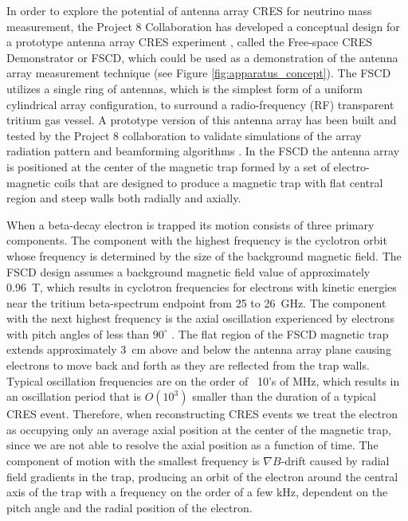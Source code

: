 In order to explore the potential of antenna array CRES for neutrino mass measurement, the Project 8 Collaboration has developed a conceptual design for a prototype antenna array CRES experiment \cite{p8PanicProc,p8snowmass2022}, called the Free-space CRES Demonstrator or FSCD, which could be used as a demonstration of the antenna array measurement technique (see Figure \ref{fig:apparatus_concept}). The FSCD utilizes a single ring of antennas, which is the simplest form of a uniform cylindrical array configuration, to surround a radio-frequency (RF) transparent tritium gas vessel. A prototype version of this antenna array has been built and tested by the Project 8 collaboration to validate simulations of the array radiation pattern and beamforming algorithms \cite{p8jugaad}. In the FSCD the antenna array is positioned at the center of the magnetic trap formed by a set of electro-magnetic coils that are designed to produce a magnetic trap with flat central region and steep walls both radially and axially. 

When a beta-decay electron is trapped its motion consists of three primary components. The component with the highest frequency is the cyclotron orbit whose frequency is determined by the size of the background magnetic field. The FSCD design assumes a background magnetic field value of approximately 0.96~T, which results in cyclotron frequencies for electrons with kinetic energies near the tritium beta-spectrum endpoint from 25 to 26~GHz. The component with the next highest frequency is the axial oscillation experienced by electrons with pitch angles of less than $90^\circ$ \cite{p8pheno}. The flat region of the FSCD magnetic trap extends approximately 3~cm above and below the antenna array plane causing electrons to move back and forth as they are reflected from the trap walls. Typical oscillation frequencies are on the order of ~10's of MHz, which results in an oscillation period that is $O(10^3)$ smaller than the duration of a typical CRES event. Therefore, when reconstructing CRES events we treat the electron as occupying only an average axial position at the center of the magnetic trap, since we are not able to resolve the axial position as a function of time. The component of motion with the smallest frequency is $\nabla B$-drift caused by radial field gradients in the trap, producing an orbit of the electron around the central axis of the trap with a frequency on the order of a few kHz, dependent on the pitch angle and the radial position of the electron. 

